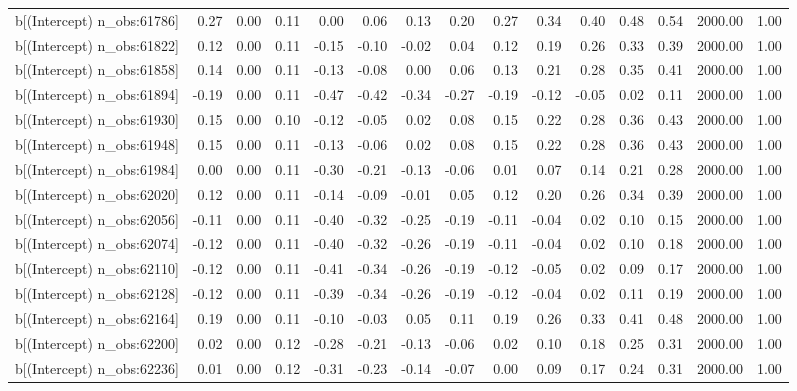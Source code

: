 \begin{table}[ht]
\begin{tabular}{rrrrrrrrrrrrrrr}
  b[(Intercept) n\_obs:61786] & 0.27 & 0.00 & 0.11 & 0.00 & 0.06 & 0.13 & 0.20 & 0.27 & 0.34 & 0.40 & 0.48 & 0.54 & 2000.00 & 1.00 \\ 
  b[(Intercept) n\_obs:61822] & 0.12 & 0.00 & 0.11 & -0.15 & -0.10 & -0.02 & 0.04 & 0.12 & 0.19 & 0.26 & 0.33 & 0.39 & 2000.00 & 1.00 \\ 
  b[(Intercept) n\_obs:61858] & 0.14 & 0.00 & 0.11 & -0.13 & -0.08 & 0.00 & 0.06 & 0.13 & 0.21 & 0.28 & 0.35 & 0.41 & 2000.00 & 1.00 \\ 
  b[(Intercept) n\_obs:61894] & -0.19 & 0.00 & 0.11 & -0.47 & -0.42 & -0.34 & -0.27 & -0.19 & -0.12 & -0.05 & 0.02 & 0.11 & 2000.00 & 1.00 \\ 
  b[(Intercept) n\_obs:61930] & 0.15 & 0.00 & 0.10 & -0.12 & -0.05 & 0.02 & 0.08 & 0.15 & 0.22 & 0.28 & 0.36 & 0.43 & 2000.00 & 1.00 \\ 
  b[(Intercept) n\_obs:61948] & 0.15 & 0.00 & 0.11 & -0.13 & -0.06 & 0.02 & 0.08 & 0.15 & 0.22 & 0.28 & 0.36 & 0.43 & 2000.00 & 1.00 \\ 
  b[(Intercept) n\_obs:61984] & 0.00 & 0.00 & 0.11 & -0.30 & -0.21 & -0.13 & -0.06 & 0.01 & 0.07 & 0.14 & 0.21 & 0.28 & 2000.00 & 1.00 \\ 
  b[(Intercept) n\_obs:62020] & 0.12 & 0.00 & 0.11 & -0.14 & -0.09 & -0.01 & 0.05 & 0.12 & 0.20 & 0.26 & 0.34 & 0.39 & 2000.00 & 1.00 \\ 
  b[(Intercept) n\_obs:62056] & -0.11 & 0.00 & 0.11 & -0.40 & -0.32 & -0.25 & -0.19 & -0.11 & -0.04 & 0.02 & 0.10 & 0.15 & 2000.00 & 1.00 \\ 
  b[(Intercept) n\_obs:62074] & -0.12 & 0.00 & 0.11 & -0.40 & -0.32 & -0.26 & -0.19 & -0.11 & -0.04 & 0.02 & 0.10 & 0.18 & 2000.00 & 1.00 \\ 
  b[(Intercept) n\_obs:62110] & -0.12 & 0.00 & 0.11 & -0.41 & -0.34 & -0.26 & -0.19 & -0.12 & -0.05 & 0.02 & 0.09 & 0.17 & 2000.00 & 1.00 \\ 
  b[(Intercept) n\_obs:62128] & -0.12 & 0.00 & 0.11 & -0.39 & -0.34 & -0.26 & -0.19 & -0.12 & -0.04 & 0.02 & 0.11 & 0.19 & 2000.00 & 1.00 \\ 
  b[(Intercept) n\_obs:62164] & 0.19 & 0.00 & 0.11 & -0.10 & -0.03 & 0.05 & 0.11 & 0.19 & 0.26 & 0.33 & 0.41 & 0.48 & 2000.00 & 1.00 \\ 
  b[(Intercept) n\_obs:62200] & 0.02 & 0.00 & 0.12 & -0.28 & -0.21 & -0.13 & -0.06 & 0.02 & 0.10 & 0.18 & 0.25 & 0.31 & 2000.00 & 1.00 \\ 
  b[(Intercept) n\_obs:62236] & 0.01 & 0.00 & 0.12 & -0.31 & -0.23 & -0.14 & -0.07 & 0.00 & 0.09 & 0.17 & 0.24 & 0.31 & 2000.00 & 1.00 \\ 

\end{tabular}
\end{table}
